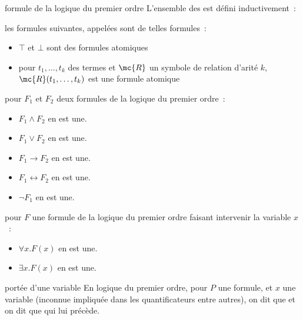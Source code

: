 \begin{definition}{7.22}{formule de la logique du premier ordre}
    L'ensemble des  est défini inductivement~:
    \begin{enumeratebf}
        \item les formules suivantes, appelées  sont de telles formules~:
        \begin{itemize}
            \item $\top$ et $\bot$ sont des formules atomiques
            \item pour $t_1, \dots, t_k$ des termes et $\mc{R}$ un symbole de relation d'arité $k$, $\mc{R}(t_1,\dots, t_k)$ est une formule atomique
        \end{itemize}
        \item pour $F_1$ et $F_2$ deux formules de la logique du premier ordre~: 
        \begin{itemize}
            \item $F_1 \wedge F_2$ en est une.
            \item $F_1 \vee F_2$ en est une.
            \item $F_1 \rightarrow F_2$ en est une.
            \item $F_1 \leftrightarrow F_2$ en est une.
            \item $\lnot F_1$ en est une.
        \end{itemize}
        \item pour $F$ une formule de la logique du premier ordre faisant intervenir la variable $x$~:
        \begin{itemize}
            \item $\forall x.F(x)$ en est une.
            \item $\exists x.F(x)$ en est une.
        \end{itemize}
    \end{enumeratebf}
\end{definition}

\begin{definition}{7.23}{portée d'une variable}
    En logique du premier ordre, pour $P$ une formule, et $x$ une variable (inconnue impliquée dans les quantificateurs entre autres), on dit que  et on dit que  qui lui précède.
\end{definition}

